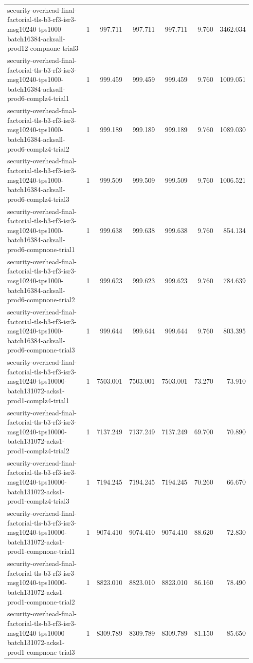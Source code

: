 \begin{tabular}{lrrrrrr}
security-overhead-final-factorial-tls-b3-rf3-isr3-msg10240-tps1000-batch16384-acksall-prod12-compnone-trial3 & 1 & 997.711 & 997.711 & 997.711 & 9.760 & 3462.034 \\
security-overhead-final-factorial-tls-b3-rf3-isr3-msg10240-tps1000-batch16384-acksall-prod6-complz4-trial1 & 1 & 999.459 & 999.459 & 999.459 & 9.760 & 1009.051 \\
security-overhead-final-factorial-tls-b3-rf3-isr3-msg10240-tps1000-batch16384-acksall-prod6-complz4-trial2 & 1 & 999.189 & 999.189 & 999.189 & 9.760 & 1089.030 \\
security-overhead-final-factorial-tls-b3-rf3-isr3-msg10240-tps1000-batch16384-acksall-prod6-complz4-trial3 & 1 & 999.509 & 999.509 & 999.509 & 9.760 & 1006.521 \\
security-overhead-final-factorial-tls-b3-rf3-isr3-msg10240-tps1000-batch16384-acksall-prod6-compnone-trial1 & 1 & 999.638 & 999.638 & 999.638 & 9.760 & 854.134 \\
security-overhead-final-factorial-tls-b3-rf3-isr3-msg10240-tps1000-batch16384-acksall-prod6-compnone-trial2 & 1 & 999.623 & 999.623 & 999.623 & 9.760 & 784.639 \\
security-overhead-final-factorial-tls-b3-rf3-isr3-msg10240-tps1000-batch16384-acksall-prod6-compnone-trial3 & 1 & 999.644 & 999.644 & 999.644 & 9.760 & 803.395 \\
security-overhead-final-factorial-tls-b3-rf3-isr3-msg10240-tps10000-batch131072-acks1-prod1-complz4-trial1 & 1 & 7503.001 & 7503.001 & 7503.001 & 73.270 & 73.910 \\
security-overhead-final-factorial-tls-b3-rf3-isr3-msg10240-tps10000-batch131072-acks1-prod1-complz4-trial2 & 1 & 7137.249 & 7137.249 & 7137.249 & 69.700 & 70.890 \\
security-overhead-final-factorial-tls-b3-rf3-isr3-msg10240-tps10000-batch131072-acks1-prod1-complz4-trial3 & 1 & 7194.245 & 7194.245 & 7194.245 & 70.260 & 66.670 \\
security-overhead-final-factorial-tls-b3-rf3-isr3-msg10240-tps10000-batch131072-acks1-prod1-compnone-trial1 & 1 & 9074.410 & 9074.410 & 9074.410 & 88.620 & 72.830 \\
security-overhead-final-factorial-tls-b3-rf3-isr3-msg10240-tps10000-batch131072-acks1-prod1-compnone-trial2 & 1 & 8823.010 & 8823.010 & 8823.010 & 86.160 & 78.490 \\
security-overhead-final-factorial-tls-b3-rf3-isr3-msg10240-tps10000-batch131072-acks1-prod1-compnone-trial3 & 1 & 8309.789 & 8309.789 & 8309.789 & 81.150 & 85.650 \\

\end{tabular}
